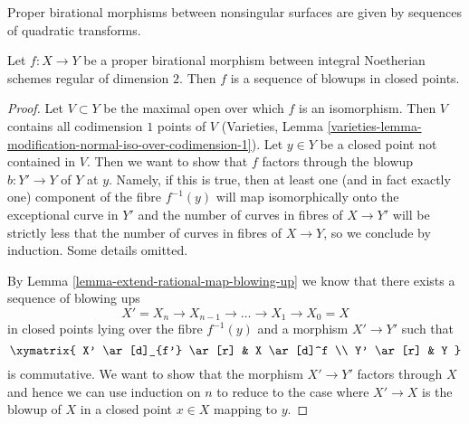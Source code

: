 \noindent
Proper birational morphisms between nonsingular surfaces are given by
sequences of quadratic transforms.

\begin{lemma}
\label{lemma-proper-birational-regular-surfaces}
Let $f : X \to Y$ be a proper birational morphism between
integral Noetherian schemes regular of dimension $2$.
Then $f$ is a sequence of blowups in closed points.
\end{lemma}

\begin{proof}
Let $V \subset Y$ be the maximal open over which $f$ is an isomorphism.
Then $V$ contains all codimension $1$ points of $V$ (Varieties,
Lemma \ref{varieties-lemma-modification-normal-iso-over-codimension-1}).
Let $y \in Y$ be a closed point not contained in $V$.
Then we want to show that $f$ factors through the blowup $b : Y' \to Y$
of $Y$ at $y$. Namely, if this is true, then at least one (and in fact
exactly one) component of the fibre $f^{-1}(y)$ will map isomorphically
onto the exceptional curve in $Y'$ and the number of curves
in fibres of $X \to Y'$ will be strictly less that the number of curves
in fibres of $X \to Y$, so we conclude by induction. Some details omitted.

\medskip\noindent
By Lemma \ref{lemma-extend-rational-map-blowing-up}
we know that there exists a sequence of blowing ups
$$
X' = X_n \to X_{n - 1} \to \ldots \to X_1 \to X_0 = X
$$
in closed points lying over the fibre $f^{-1}(y)$
and a morphism $X' \to Y'$ such that
$$
\xymatrix{
X' \ar[d]_{f'} \ar[r] & X \ar[d]^f \\
Y' \ar[r] & Y
}
$$
is commutative. We want to show that the morphism $X' \to Y'$
factors through $X$ and hence we can use induction on $n$ to
reduce to the case where $X' \to X$ is the blowup of $X$
in a closed point $x \in X$ mapping to $y$.


\end{proof}
